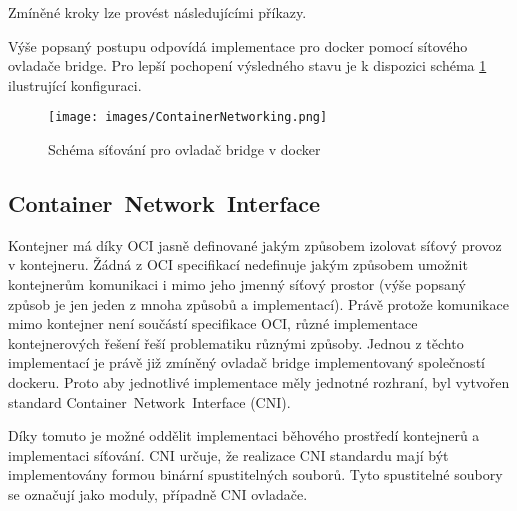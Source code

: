 Zmíněné kroky lze provést následujícími příkazy.



Výše popsaný postupu odpovídá implementace pro docker pomocí sítového ovladače bridge. Pro lepší pochopení výsledného stavu je k dispozici schéma \ref{img:ContainerNetworking} ilustrující konfiguraci.

\begin{figure}[ht]
\centering
\texttt{[image: images/ContainerNetworking.png]}
\caption[Schéma síťování pro ovladač bridge v docker]{Schéma síťování pro ovladač bridge v docker \cite{velichko_2020_connecting}}\label{img:ContainerNetworking}
\end{figure}

\subsection{Container~Network~Interface}\label{cni}
Kontejner má díky OCI jasně definované jakým způsobem izolovat síťový provoz v kontejneru. Žádná z OCI specifikací nedefinuje jakým způsobem umožnit kontejnerům komunikaci i mimo jeho jmenný síťový prostor (výše popsaný způsob je jen jeden z mnoha způsobů a implementací). Právě protože komunikace mimo kontejner není součástí specifikace OCI, různé implementace kontejnerových řešení řeší problematiku různými způsoby. Jednou z těchto implementací je právě již zmíněný ovladač bridge implementovaný společností dockeru. Proto aby jednotlivé implementace měly jednotné rozhraní, byl vytvořen standard Container~Network~Interface (CNI).

Díky tomuto je možné oddělit implementaci běhového prostředí kontejnerů a implementaci síťování. CNI určuje, že realizace CNI standardu mají být implementovány formou binární spustitelných souborů. Tyto spustitelné soubory se označují jako moduly, případně CNI ovladače.

